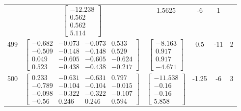 \documentclass[a4paper,12pt]{article}
\begin{document}
\begin{tabular}{c c c c c c}
&
$\begin{bmatrix} -12.238 \\ 0.562 \\ 0.562 \\ 5.114 \end{bmatrix}$
&
1.5625
&
-6
&
1
\\
499
&
$\begin{bmatrix} -0.682 & -0.073 & -0.073 & 0.533 \\ -0.509 & -0.148 & -0.148 & 0.529 \\ 0.049 & -0.605 & -0.605 & -0.624 \\ 0.523 & -0.438 & -0.438 & -0.217 \end{bmatrix}$
&
$\begin{bmatrix} -8.163 \\ 0.917 \\ 0.917 \\ -4.671 \end{bmatrix}$
&
0.5
&
-11
&
2
\\
500
&
$\begin{bmatrix} 0.233 & -0.631 & -0.631 & 0.797 \\ -0.789 & -0.104 & -0.104 & -0.015 \\ -0.098 & -0.322 & -0.322 & -0.107 \\ -0.56 & 0.246 & 0.246 & 0.594 \end{bmatrix}$
&
$\begin{bmatrix} -11.538 \\ -0.16 \\ -0.16 \\ 5.858 \end{bmatrix}$
&
-1.25
&
-6
&
3
\\
\end{tabular} \egroup \newpage
\end{document}

